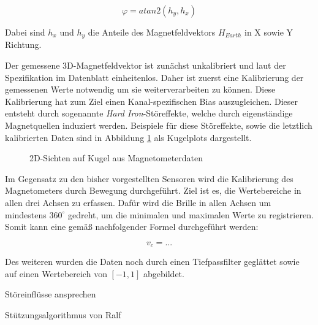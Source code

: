 \begin{equation}
    \varphi = atan2(h_y,h_x)
\end{equation}

Dabei sind $h_x$ und $h_y$ die Anteile des Magnetfeldvektors $H_{Earth}$ in X sowie Y Richtung.

Der gemessene 3D-Magnetfeldvektor ist zunächst unkalibriert und laut der Spezifikation im Datenblatt  einheitenlos.
Daher ist zuerst eine Kalibrierung der gemessenen Werte notwendig um sie weiterverarbeiten zu können. 
Diese Kalibrierung hat zum Ziel einen Kanal-spezifischen Bias auszugleichen. 
Dieser entsteht durch sogenannte \textit{Hard Iron}-Störeffekte, welche durch eigenständige Magnetquellen induziert werden.
Beispiele für diese Störeffekte, sowie die letztlich kalibrierten Daten sind in Abbildung \ref{fig:mag_kugel_plots} als Kugelplots dargestellt.

\begin{figure}[ht]
\centering
{}

\caption[]{2D-Sichten auf Kugel aus Magnetometerdaten}
\label{fig:mag_kugel_plots}
\end{figure}


Im Gegensatz zu den bisher vorgestellten Sensoren wird die Kalibrierung des Magnetometers durch Bewegung durchgeführt.
Ziel ist es, die Wertebereiche in allen drei Achsen zu erfassen.
Dafür wird die Brille in allen Achsen um mindestens $360^\circ$ gedreht, um die minimalen und maximalen Werte zu registrieren. 
Somit kann eine gemäß nachfolgender Formel durchgeführt werden:

\begin{equation}
    v_c = ...
\end{equation}

Des weiteren wurden die Daten noch durch einen Tiefpassfilter geglättet sowie auf einen Wertebereich von $[-1,1]$ abgebildet.

Störeinflüsse ansprechen

Stützungsalgorithmus von Ralf
